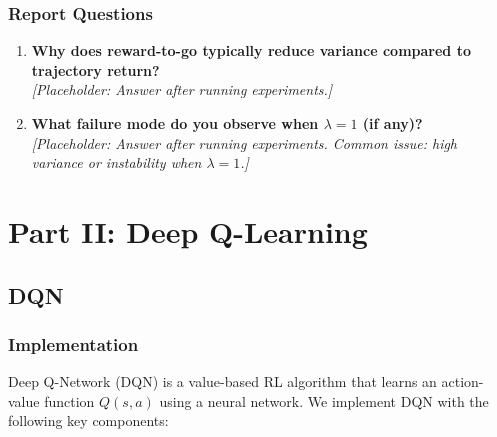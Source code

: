 \documentclass[11pt, a4paper, oneside]{memoir}
\begin{document}
\subsection{Report Questions}

\begin{enumerate}
\item \textbf{Why does reward-to-go typically reduce variance compared to trajectory return?} \\
\emph{[Placeholder: Answer after running experiments.]}

\item \textbf{What failure mode do you observe when $\lambda = 1$ (if any)?} \\
\emph{[Placeholder: Answer after running experiments. Common issue: high variance or instability when $\lambda=1$.]}
\end{enumerate}

\chapter{Part II: Deep Q-Learning}
\label{ch:part2}

\section{DQN}
\label{sec:dqn}

\subsection{Implementation}

Deep Q-Network (DQN) is a value-based RL algorithm that learns an action-value function $Q(s, a)$ using a neural network. We implement DQN with the following key components:
\end{document}

